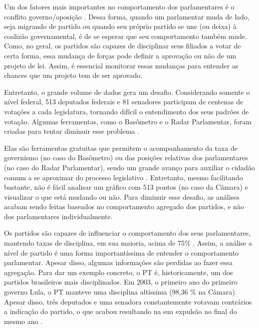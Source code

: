 Um dos fatores mais importantes no comportamento dos parlamentares é o conflito
governo/oposição \cite{Leoni2002,Desposato2005b,Freitas2012,Izumi2013}. Dessa
forma, quando um parlamentar muda de lado, seja migrando de partido ou quando
seu próprio partido se une (ou deixa) à coalizão governamental, é de se esperar
que seu comportamento também mude. Como, no geral, os partidos são capazes de
disciplinar seus filiados a votar de certa forma, essa mudança de forças pode
definir a aprovação ou não de um projeto de lei. Assim, é essencial monitorar
essas mudanças para entender as chances que um projeto tem de ser aprovado.

Entretanto, o grande volume de dados gera um desafio. Considerando somente o
nível federal, 513 deputados federais e 81 senadores participam de centenas de
votações a cada legislatura, tornando difícil o entendimento dos seus padrões
de votação. Algumas ferramentas, como o Basômetro e o Radar Parlamentar, foram
criadas para tentar diminuir esse problema \cite{Estadao2012,Trento2013}.

Elas são ferramentas gratuitas que permitem o acompanhamento da taxa de
governismo (no caso do Basômetro) ou das posições relativas dos parlamentares
(no caso do Radar Parlamentar), sendo um grande avanço para auxiliar o cidadão
comum a se aproximar do processo legislativo \cite{Dantas2014}. Entretanto,
mesmo facilitando bastante, não é fácil analisar um gráfico com 513 pontos (no
caso da Câmara) e visualizar o que está mudando ou não. Para diminuir esse
desafio, as análises acabam sendo feitas baseados no comportamento agregado dos
partidos, e não dos parlamentares individualmente.

Os partidos são capazes de influenciar o comportamento dos seus parlamentares,
mantendo taxas de disciplina, em sua maioria, acima de 75\%
\cite{Figueiredo2001,Cheibub2009,Zucco2009}. Assim, a análise a nível de partido
é uma forma importantíssima de entender o comportamento parlamentar. Apesar
disso, algumas informações são perdidas ao fazer essa agregação. Para dar um
exemplo concreto, o \gls{PT} é, historicamente, um dos partidos brasileiros mais
disciplinados. Em 2003, o primeiro ano do primeiro governo Lula, o \gls{PT} manteve uma
disciplina altíssima (98,36 \% na Câmara). Apesar disso, três deputados e uma
senadora constantemente votavam contrários a indicação do partido, o que acabou
resultando na sua expulsão no final do mesmo ano \cite{Breve2013}.

